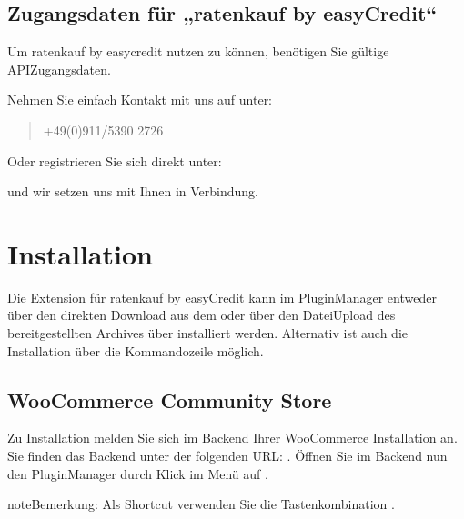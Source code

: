 \documentclass[a4paper,10pt,openany,oneside,ngerman]{sphinxmanual}
\begin{document}
\section{Zugangsdaten für „ratenkauf by easyCredit“}
\label{\detokenize{requirements:zugangsdaten-fur-ratenkauf-by-easycredit}}
Um ratenkauf by easycredit nutzen zu können, benötigen Sie gültige API\sphinxhyphen{}Zugangsdaten.

Nehmen Sie einfach Kontakt mit uns auf unter:
\begin{quote}


+49(0)911/5390 2726
\end{quote}

Oder registrieren Sie sich direkt unter:
\begin{quote}

\end{quote}

und wir setzen uns mit Ihnen in Verbindung.


\chapter{Installation}
\label{\detokenize{installation:installation}}\label{\detokenize{installation::doc}}
Die Extension für ratenkauf by easyCredit kann im Plugin\sphinxhyphen{}Manager entweder über den direkten Download aus dem  oder über den Datei\sphinxhyphen{}Upload des bereitgestellten Archives über  installiert werden.
Alternativ ist auch die Installation über die Kommandozeile möglich.


\section{WooCommerce Community Store}
\label{\detokenize{installation:woocommerce-community-store}}
Zu Installation melden Sie sich im Backend Ihrer WooCommerce Installation an. Sie finden das Backend unter der folgenden URL: .
Öffnen Sie im Backend nun den Plugin\sphinxhyphen{}Manager durch Klick im Menü auf .

\begin{sphinxadmonition}{note}{Bemerkung:}
Als Shortcut verwenden Sie die Tastenkombination .
\end{sphinxadmonition}
\end{document}
